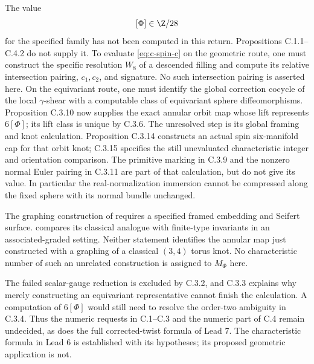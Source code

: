 \begin{problem}
The value
\[
 [\Phi]\in\Z/28
\]
for the specified family has not been computed in this return.
Propositions C.1.1--C.4.2 do not supply it. To evaluate
\eqref{eq:c-spin-c} on the geometric route, one must construct the
specific resolution $W_8$ of a descended filling and compute its
relative intersection pairing, $c_1,c_2$, and signature. No such
intersection pairing is asserted here. On the equivariant route,
one must identify the global correction cocycle of the local
$\gamma$-shear with a computable class of equivariant sphere
diffeomorphisms. Proposition C.3.10 now supplies the exact annular
orbit map whose lift represents $6[\Phi]$; its lift class is unique
by C.3.6. The unresolved step is its global framing and knot
calculation. Proposition C.3.14 constructs an actual spin
six-manifold cap for that orbit knot; C.3.15 specifies the still
unevaluated characteristic integer and orientation comparison.
The primitive marking in C.3.9 and the nonzero normal
Euler pairing in C.3.11 are part of that calculation, but do not
give its value. In particular the real-normalization immersion
cannot be compressed along the fixed sphere with its normal bundle
unchanged.

The graphing construction of
\citet[Section 2.2, Theorem 2.1, and Remark 5.1]{RosemanTakase2007D}
requires a specified framed embedding and Seifert surface.
\citet[Remark 5.9]{Koytcheff2025Root} compares its classical
analogue with finite-type invariants in an associated-graded
setting. Neither statement identifies the annular map just
constructed with a graphing of a classical $(3,4)$ torus knot.
No characteristic number of such an unrelated construction is
assigned to $M_\Phi$ here.

The failed scalar-gauge reduction is excluded by C.3.2, and
C.3.3 explains why merely constructing an equivariant representative
cannot finish the calculation. A computation of $6[\Phi]$ would
still need to resolve the order-two ambiguity in C.3.4. Thus the
numeric requests in C.1--C.3 and the numeric part of C.4 remain
undecided, as does the full corrected-twist formula of Lead 7.
The characteristic formula in Lead 6 is established with its
hypotheses; its proposed geometric application is not.
\end{problem}
